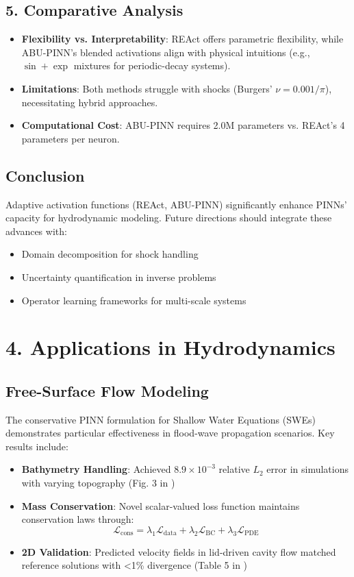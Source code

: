 \subsection*{5. Comparative Analysis}
\begin{itemize}
    \item \textbf{Flexibility vs. Interpretability}: REAct offers parametric flexibility, while ABU-PINN's blended activations align with physical intuitions (e.g., $\sin+\exp$ mixtures for periodic-decay systems).
    \item \textbf{Limitations}: Both methods struggle with shocks (Burgers' $\nu=0.001/\pi$), necessitating hybrid approaches.
    \item \textbf{Computational Cost}: ABU-PINN requires 2.0M parameters vs. REAct's 4 parameters per neuron.
\end{itemize}

\subsection*{Conclusion}
Adaptive activation functions (REAct, ABU-PINN) significantly enhance PINNs' capacity for hydrodynamic modeling. Future directions should integrate these advances with:
\begin{itemize}
    \item Domain decomposition for shock handling
    \item Uncertainty quantification in inverse problems
    \item Operator learning frameworks for multi-scale systems
\end{itemize}

\section*{4. Applications in Hydrodynamics}
\subsection*{Free-Surface Flow Modeling}
The conservative PINN formulation for Shallow Water Equations (SWEs) \cite{free_surface} demonstrates particular effectiveness in flood-wave propagation scenarios. Key results include:
\begin{itemize}
    \item \textbf{Bathymetry Handling}: Achieved $8.9 \times 10^{-3}$ relative $L_2$ error in simulations with varying topography (Fig. 3 in \cite{free_surface})
    \item \textbf{Mass Conservation}: Novel scalar-valued loss function maintains conservation laws through:
    \[
    \mathcal{L}_{\text{cons}} = \lambda_1\mathcal{L}_{\text{data}} + \lambda_2\mathcal{L}_{\text{BC}} + \lambda_3\mathcal{L}_{\text{PDE}}
    \]
    \item \textbf{2D Validation}: Predicted velocity fields in lid-driven cavity flow matched reference solutions with <1\% divergence (Table 5 in \cite{abu_pinn})
\end{itemize}

